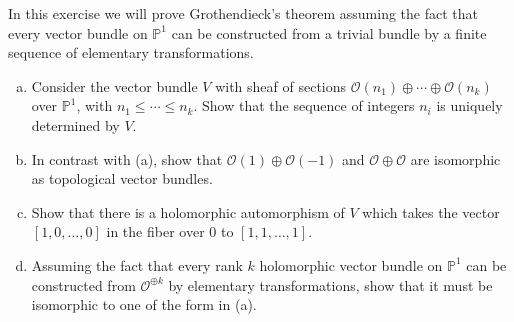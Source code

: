 \documentclass[12pt]{article}
\begin{document}
\begin{exercise}
In this exercise we will prove Grothendieck's theorem assuming the fact that every vector bundle on $\mathbb{P}^1$ can be constructed from a trivial bundle by a finite sequence of elementary transformations.
    \begin{enumerate}[(a)]
        \item Consider the vector bundle $V$ with sheaf of sections $\mathcal{O}(n_1) \oplus \cdots \oplus \mathcal{O}(n_k)$ over $\mathbb{P}^1$, with $n_1 \le \cdots \le n_k$. Show that the sequence of integers $n_i$ is uniquely determined by $V$.
        \item In contrast with (a), show that $\mathcal{O}(1)\oplus\mathcal{O}(-1)$ and $\mathcal{O}\oplus\mathcal{O}$ are isomorphic as topological vector bundles.
        \item Show that there is a holomorphic automorphism of $V$ which takes the vector $[1,0,\dots,0]$ in the fiber over $0$ to $[1,1,\dots,1]$.
        \item Assuming the fact that every rank $k$ holomorphic vector bundle on $\mathbb{P}^1$ can be constructed from $\mathcal{O}^{\oplus k}$ by elementary transformations, show that it must be isomorphic to one of the form in (a).
    \end{enumerate}
\end{exercise}
\end{document}
